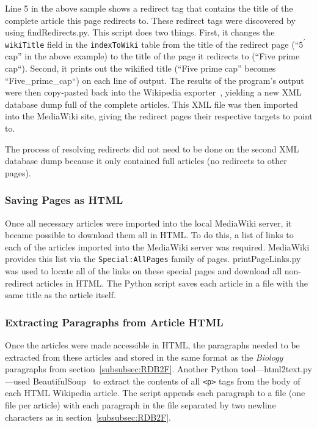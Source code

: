 Line 5 in the above sample shows a redirect tag that contains the title of the complete article this page redirects to.
These redirect tags were discovered by using findRedirects.py.
This script does two things.
First, it changes the {\tt wikiTitle} field in the {\tt indexToWiki} table from the title of the redirect page (``$5^\prime$ cap'' in the above example) to the title of the page it redirects to (``Five prime cap``).
Second, it prints out the wikified title (``Five prime cap'' becomes ``Five\_prime\_cap``) on each line of output.
The results of the program's output were then copy-pasted back into the Wikipedia exporter~\cite{wiki-exporter}, yielding a new XML database dump full of the complete articles.
This XML file was then imported into the MediaWiki site, giving the redirect pages their respective targets to point to.

The process of resolving redirects did not need to be done on the second XML database dump because it only contained full articles (no redirects to other pages).

\subsubsection{Saving Pages as HTML}
\label{sec:html-pages}

Once all necessary articles were imported into the local MediaWiki server, it became possible to download them all in HTML.
To do this, a list of links to each of the articles imported into the MediaWiki server was required.
MediaWiki provides this list via the {\tt Special:AllPages} family of pages.
printPageLinks.py was used to locate all of the links on these special pages and download all non-redirect articles in HTML.
The Python script saves each article in a file with the same title as the article itself.

\subsubsection{Extracting Paragraphs from Article HTML}
\label{sec:training-files}

Once the articles were made accessible in HTML, the paragraphs needed to be extracted from these articles and stored in the same format as the {\it Biology} paragraphs from section~\ref{subsubsec:RDB2F}.
Another Python tool---html2text.py---used BeautifulSoup~\cite{beautifulsoup} to extract the contents of all {\tt <p>} tags from the body of each HTML Wikipedia article.
The script appends each paragraph to a file (one file per article) with each paragraph in the file separated by two newline characters as in section~\ref{subsubsec:RDB2F}.

